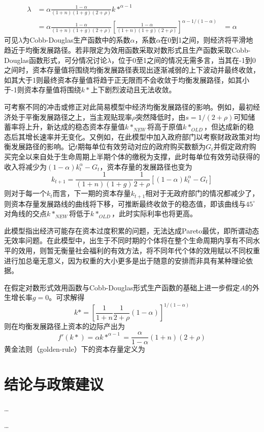 \documentclass[supercite]{HustGraduPaper}
\begin{document}
    \begin{equation}
    \begin{aligned}
    \lambda &=\alpha\frac{1-\alpha}{(1+n)(1+g)(2+\rho)}k*^{\alpha-1}\\
    &=\alpha\frac{1-\alpha}{(1+n)(1+g)(2+\rho)}[\frac{1-\alpha}{(1+n)(1+g)(2+\rho)}]^{\alpha-1/(1-\alpha)}
    &=\alpha
    \end{aligned}
    \end{equation}
    可见$\lambda$为Cobb-Douglas生产函数中的系数$\alpha$，系数$\alpha$在0到1之间，则经济将平滑地趋近于均衡发展路径。若非限定为效用函数采取对数形式且生产函数采取Cobb-Douglas函数形式，可分情况讨论$\lambda$，位于0至1之间的情况无需多言，当其在-1到0之间时，资本存量值将围绕均衡发展路径表现出逐渐减弱的上下波动并最终收敛，如其大于1则最终资本存量值将趋于正无限而不会收敛于均衡发展路径，如其小于-1则资本存量值将围绕$k*$上下剧烈波动且无法收敛。    
    
    可考察不同的冲击或修正对此简易模型中经济均衡发展路径的影响。例如，最初经济处于平衡发展路径之上，当主观贴现率$\rho$突然降低时，由$s=1/(2+\rho)$可知储蓄率将上升，新达成的稳态资本存量值$k*_{NEW}$将高于原值$k*_{OLD}$，但达成新的稳态后其增长速率并无变化。又例如，在此模型中加入政府部门以考察财政政策对均衡发展路径的影响。记$t$期每单位有效劳动对应的政府购买数额为$G_t$并假定政府购买完全以来自处于生命周期上半期个体的缴税为支撑，此时每单位有效劳动获得的收入将减少为$(1-\alpha)k_t^\alpha-G_t$，资本存量的发展路径也变为
    \begin{equation}
    k_{t+1}=\frac{1}{(1+n)(1+g)}\frac{1}{2+\rho}[(1-\alpha)k_{t}^\alpha-G_t]
    \end{equation}
    则对于每一个$k_t$而言，下一期的资本存量$k_{t+1}$相对于无政府部门的情况都减少了，则资本存量发展路线的曲线将下移，可推断最终收敛于的稳态值，即该曲线与$45^{\circ}$对角线的交点$k*_{NEW}$将低于$k*_{OLD}$，此时实际利率也将更高。

    此模型指出经济可能存在资本过度积累的问题，无法达成Pareto最优，即所谓动态无效率问题。在此模型中，出生于不同时期的个体将在整个生命周期内享有不同水平的效用，则暂无衡量社会福利的有效方法，将不同年代个体的效用赋以不同权重进行加总毫无意义，因为权重的大小更多是出于随意的安排而非具有某种理论依据。

    在假定对数形式效用函数与Cobb-Douglas形式生产函数的基础上进一步假定$A$的外生增长率$g=0$。可求解得
    \begin{equation}
    k*=[\frac{1}{1+n}\frac{1}{2+\rho}(1-\alpha)]^{1/(1-\alpha)}
    \end{equation}
    则在均衡发展路径上资本的边际产出为
    \begin{equation}
    f'(k*)=\alpha k*^{\alpha-1}=\frac{\alpha}{1-\alpha}(1+n)(2+\rho)
    \end{equation}
    黄金法则（golden-rule）下的资本存量定义为

    \section{结论与政策建议}
    \ldots
    
    
    
    \begin{thankpage}
    \ldots
    \end{thankpage}

    
    
\end{document}
